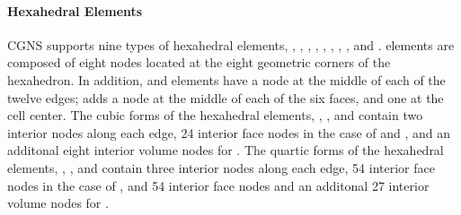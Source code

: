 {{{\paragraph{Hexahedral Elements}
CGNS supports nine types of hexahedral elements, ,
, , , , ,
, , and .
 elements are composed of eight nodes located at the
eight geometric corners of the hexahedron.
In addition,  and  elements have a node
at the middle of each of the twelve edges;  adds a
node at the middle of each of the six faces, and one at the cell center.
The cubic forms of the hexahedral elements, ,
, and 
contain two interior nodes along each edge, 24 interior face nodes
in the case of  and , and an additonal
eight interior volume nodes for .
The quartic forms of the hexahedral elements, 
, , and 
contain three interior nodes along each edge, 54 interior face nodes
in the case of , and 54 interior face nodes and an additonal
27 interior volume nodes for .

\newpage
{}

}}}
